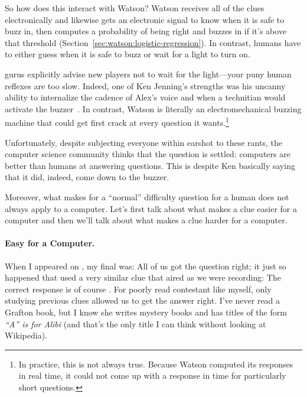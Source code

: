 So how does this interact with Watson?
%
Watson receives all of the clues electronically and likewise gets an
electronic signal to know when it is safe to buzz in, then computes a
probability of being right and buzzes in if it's above that threshold
(Section~\ref{sec:watson:logistic-regression}).
%
In contrast, humans have to either guess when it is safe to buzz or
wait for a light to turn on.


\jeopardy{} gurus explicitly advise new players not to wait for the light---your puny human reflexes are too slow.
%
Indeed, one of Ken Jenning's strengths was his uncanny ability to
internalize the cadence of Alex's voice and when a technitian would
activate the buzzer~\citep{jennings-06}.
%
In contrast, Watson is literally an electromechanical buzzing machine
that could get first crack at every question it wants.\footnote{In
practice, this is not always true.  Because Watson computed its
responses in real time, it could not come up with a response in time
for particularly short questions.}

Unfortunately, despite subjecting everyone within earshot to these
rants, the computer science community thinks that the question is
settled: computers are better than humans at answering questions.
%
This is despite Ken basically saying that it did, indeed, come down to
the buzzer.

Moreover, what makes for a ``normal'' difficulty question for a human
does not always apply to a computer.
%
Let's first talk about what makes a clue easier for a computer and
then we'll talk about what makes a clue harder for a computer.

\paragraph{Easy for a Computer.}

When I appeared on \jeopardy{}, my final \jeopardy{} was:
%
All of us got the question right; it just so happened that \jeopardy{}
used a very similar clue that aired as we were recording:
%
%
The correct response is of course .
%
For poorly read contestant like myself, only studying previous clues
allowed us to get the answer right.
%
I've never read a Grafton book, but I know she writes mystery books and
has titles of the form \textit{``A'' is for Alibi} (and that's the
only title I can think without looking at Wikipedia).

